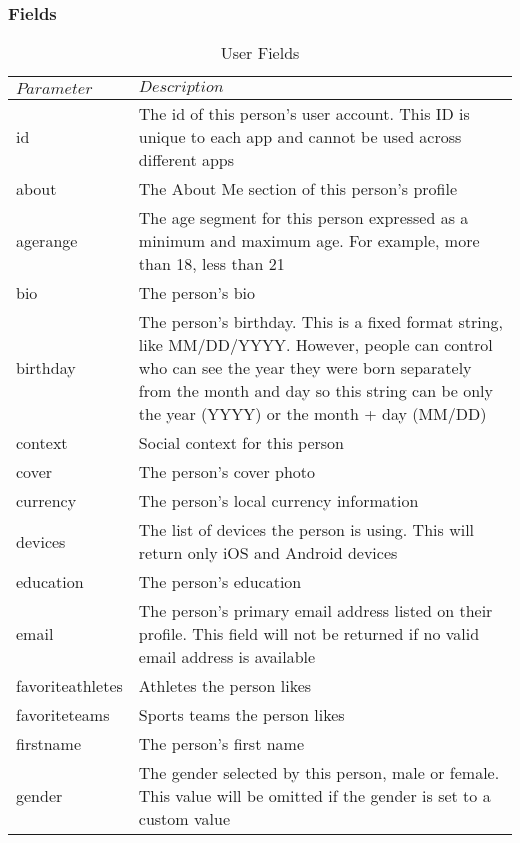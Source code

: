 \documentclass{article}
\begin{document}
	\subsubsection{Fields}
		\begin{table}[H]
		\centering
		\caption{User Fields}
		\label{my-label}
		\begin{tabularx}{\textwidth}{|l|X|}
		\centering
		\caption{User Fields}
		\hline
		$Parameter$ & $Description$ 	\\ \hline
		id 				& The id of this person's user account. This ID is unique to each app and cannot be used across different apps \\ \hline
		about 			& The About Me section of this person's profile \\ \hline
		age\textunderscore range 		& The age segment for this person expressed as a minimum and maximum age. For example, more than 18, less than 21 \\   \hline
		bio 		& The person's bio \\   \hline
		birthday 		& The person's birthday. This is a fixed format string, like MM/DD/YYYY. However, people can control who can see the year they were born separately from the month and day so this string can be only the year (YYYY) or the month + day (MM/DD) \\   \hline
		context 		& Social context for this person \\   \hline
		cover 		& The person's cover photo \\   \hline
		currency 		& The person's local currency information \\   \hline
		devices 			& The list of devices the person is using. This will return only iOS and Android devices \\ \hline
		education 			& The person's education \\ \hline
		email 			& The person's primary email address listed on their profile. This field will not be returned if no valid email address is available \\ \hline
		favorite\textunderscore athletes 		& Athletes the person likes	\\ \hline
		favorite\textunderscore teams 		& Sports teams the person likes	\\ \hline
		first\textunderscore name 		& The person's first name	\\ \hline
		gender 			& The gender selected by this person, male or female. This value will be omitted if the gender is set to a custom value
 \\ \hline

\end{tabularx}
\end{table}
\end{document}
